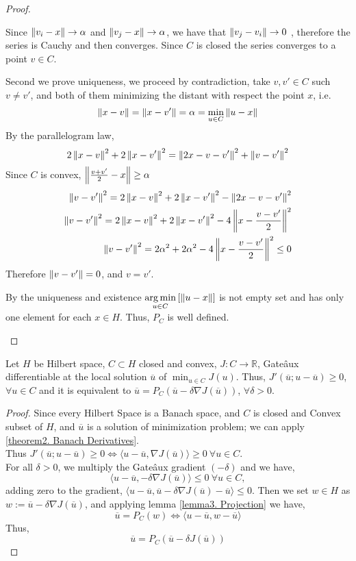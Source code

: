 \begin{lemma}
\begin{proof}
\begin{enumerate}
		Since $\left\lVert v_i-x\right\rVert\rightarrow \alpha$ and $\left\lVert v_j -x\right\rVert\rightarrow \alpha$, we have that $\left\lVert v_j-v_i\right\rVert\rightarrow 0$ , therefore the series is Cauchy and then converges. Since $C$ is closed the series converges to a point $v \in C$. 
		
		Second we prove uniqueness, we proceed by contradiction, take $v, v' \in C$ such $v\neq v'$, and both of them minimizing the distant with respect the point $x$, i.e.
		\[
		\left\lVert x-v\right\rVert=\left\lVert x-v'\right\rVert=\alpha=\min_{u\in C}\left\lVert u-x\right\rVert
		\]
		By the parallelogram law,
		\begin{equation*}
			2\left\lVert x-v\right\rVert^2+2\left\lVert x-v'\right\rVert^2=\left\lVert2x-v-v'\right\rVert^2 +\left\lVert v-v'\right\rVert^2
		\end{equation*}
		Since $C$ is convex, $\left\lVert\frac{v+v'}{2}-x\right\rVert\geq\alpha$
		\begin{align*}
			\left\lVert v-v'\right\rVert^2=2\left\lVert x-v\right\rVert^2+2\left\lVert x-v'\right\rVert^2-\left\lVert2x-v-v'\right\rVert^2 \\
			\left\lVert v-v'\right\rVert^2=2\left\lVert x-v\right\rVert^2+2\left\lVert x-v'\right\rVert^2-4\left\lVert x-\frac{v-v'}{2}\right\rVert^2 \\
			\left\lVert v-v'\right\rVert^2=2\alpha^2+2\alpha^2-4\left\lVert x-\frac{v-v'}{2}\right\rVert^2\leq 0
		\end{align*}
		Therefore $\left\lVert v-v'\right\rVert=0$, and $v=v'$.
		
		By the uniqueness and existence ${\displaystyle {\underset {u\in C}{\operatorname {arg\,min} }}\left[\left\lVert u-x\right\rVert\right]}$ is not empty set and has only one element for each $x \in H$. Thus, $P_C$ is well defined.
	\end{enumerate}
\end{proof}
\end{lemma}
\begin{theorem}
Let $H$ be Hilbert space, $C \subset H$ closed and convex, $J: C \rightarrow \mathbb{R}$, Gate\^aux differentiable at the local solution $\overline{u}$ of $\min_{u\in C} J(u)$. Thus, $J'(\overline{u};u-\overline{u}) \geq 0$, $\forall u \in C$ and it is equivalent to $ \overline{u}=P_C(\overline{u}-\delta\nabla J(\overline{u}))$, $\forall \delta >0$. 
\begin{proof} 
Since every Hilbert Space is a Banach space, and $C$ is closed and Convex subset of $H$, and $\overline{u}$ is a solution of minimization problem; we can apply \ref{theorem2. Banach Derivatives}.\\
 Thus	$J'\left(\overline{u}; u-\overline{u}\right)\geq 0 \iff \langle u-\overline{u}, \nabla J(\overline{u})\rangle \geq 0 \ \forall u \in C$. \\
For all $\delta >0$, we multiply the Gate\^aux gradient  $(-\delta)$ and we have,
\[\langle u-\overline{u}, -\delta \nabla J(\overline{u}) \rangle \leq 0 \ \forall u \in C,\] adding zero to the gradient, $ \langle u-\overline{u}, \overline{u}-\delta\nabla J(\overline{u})-\overline{u}\rangle \leq 0$. Then we set $w \in H$ as $w:= \overline{u}-\delta  \nabla J(\overline{u})$, and applying lemma \ref{lemma3. Projection} we have,
\[
	\overline{u}=P_C(w)	\iff \langle u -\overline{u},w-\overline{u}\rangle
\]
Thus, 
	\[
		\overline{u}=P_C(\overline{u}-\delta J(\overline{u}))
	\]
\end{proof}
\end{theorem}
